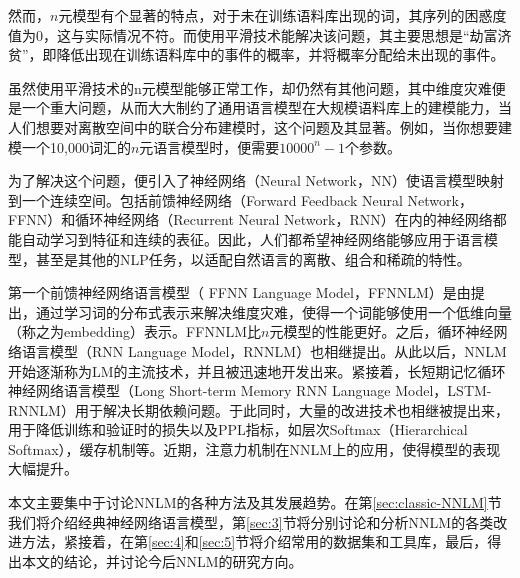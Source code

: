 \documentclass[a4paper, 12pt, twocolumn]{article}
\begin{document}
  然而，$n$元模型有个显著的特点，对于未在训练语料库出现的词，其序列的困惑度值为0，这与实际情况不符。而使用平滑技术能解决该问题，其主要思想是“劫富济贫”，即降低出现在训练语料库中的事件的概率，并将概率分配给未出现的事件。

虽然使用平滑技术的n元模型能够正常工作，却仍然有其他问题，其中维度灾难便是一个重大问题，从而大大制约了通用语言模型在大规模语料库上的建模能力，当人们想要对离散空间中的联合分布建模时，这个问题及其显著。例如，当你想要建模一个10,000词汇的$n$元语言模型时，便需要$10000^n-1$个参数。

为了解决这个问题，便引入了神经网络（Neural Network，NN）使语言模型映射到一个连续空间。包括前馈神经网络（Forward Feedback Neural Network，FFNN）和循环神经网络（Recurrent Neural Network，RNN）在内的神经网络都能自动学习到特征和连续的表征。因此，人们都希望神经网络能够应用于语言模型，甚至是其他的NLP任务，以适配自然语言的离散、组合和稀疏的特性。

第一个前馈神经网络语言模型（ FFNN Language Model，FFNNLM）是由\cite{bengio2003neural}提出，通过学习词的分布式表示来解决维度灾难，使得一个词能够使用一个低维向量（称之为embedding）表示。FFNNLM比$n$元模型的性能更好。之后，循环神经网络语言模型（RNN Language Model，RNNLM）\cite{mikolov2010recurrent}也相继提出。从此以后，NNLM开始逐渐称为LM的主流技术，并且被迅速地开发出来。紧接着，长短期记忆循环神经网络语言模型（Long Short-term Memory RNN Language Model，LSTM-RNNLM）\cite{sundermeyer2012lstm}用于解决长期依赖问题。于此同时，大量的改进技术也相继被提出来，用于降低训练和验证时的损失以及PPL指标，如层次Softmax（Hierarchical Softmax），缓存机制等。近期，注意力机制在NNLM上的应用，使得模型的表现大幅提升。

本文主要集中于讨论NNLM的各种方法及其发展趋势。在第\ref{sec:classic-NNLM}节我们将介绍经典神经网络语言模型，第\ref{sec:3}节将分别讨论和分析NNLM的各类改进方法，紧接着，在第\ref{sec:4}和\ref{sec:5}节将介绍常用的数据集和工具库，最后，得出本文的结论，并讨论今后NNLM的研究方向。
\end{document}
